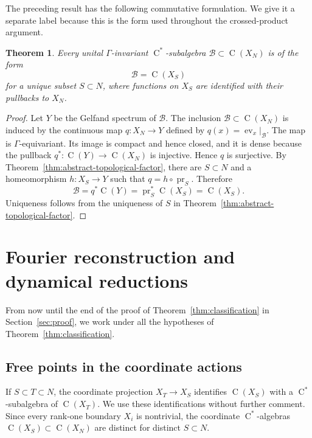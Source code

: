 \documentclass[11pt]{amsart}
\numberwithin{equation}{section}
\newcommand{\rC}{\operatorname{C}}
\newtheorem{theorem}{Theorem}[section]
\theoremstyle{definition}
\begin{document}
	The preceding result has the following commutative formulation.  We give it a
	separate label because this is the form used throughout the crossed-product
	argument.
	
	\begin{theorem}
		\label{thm:dani-coordinate}
		Every unital $\Gamma$-invariant $\rC^*$-subalgebra
		$\mathcal B\subset\rC(X_N)$ is of the form
		\[
		\mathcal B=\rC(X_S)
		\]
		for a unique subset $S\subset N$, where functions on $X_S$ are identified with
		their pullbacks to $X_N$.
	\end{theorem}
	
	\begin{proof}
		Let $Y$ be the Gelfand spectrum of $\mathcal B$. The inclusion
		$\mathcal B\subset\rC(X_N)$ is induced by the continuous map $q:X_N\to Y$
		defined by $q(x)=\operatorname{ev}_x|_{\mathcal B}$.
		The map is $\Gamma$-equivariant.  Its image is compact and hence closed, and it
		is dense because the pullback $q^*:\rC(Y)\to\rC(X_N)$ is injective.  Hence $q$
		is surjective.  By Theorem~\ref{thm:abstract-topological-factor}, there are
		$S\subset N$ and a homeomorphism $h:X_S\to Y$ such that
		$q=h\circ\operatorname{pr}_S$.  Therefore
		\[
		\mathcal B=q^*\rC(Y)
		=\operatorname{pr}_S^*\rC(X_S)
		=\rC(X_S).
		\]
		Uniqueness follows from the uniqueness of $S$ in
		Theorem~\ref{thm:abstract-topological-factor}.
	\end{proof}
	
	\section{Fourier reconstruction and dynamical reductions}
	
	From now until the end of the proof of Theorem~\ref{thm:classification} in Section~\ref{sec:proof},
	we work under all the hypotheses of Theorem~\ref{thm:classification}.
	
	\subsection{Free points in the coordinate actions}
	
	If $S\subset T\subset N$, the coordinate projection $X_T\to X_S$ identifies
	$\rC(X_S)$ with a $\rC^*$-subalgebra of $\rC(X_T)$.  We use these identifications
	without further comment.  Since every rank-one boundary $X_i$ is nontrivial,
	the coordinate $\rC^*$-algebras $\rC(X_S)\subset\rC(X_N)$ are distinct for distinct
	$S\subset N$.
	
\end{document}
